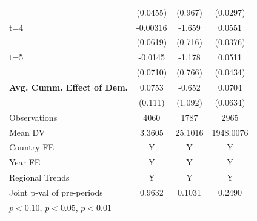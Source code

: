 \begin{tabular}{l*{3}{c}}
            &    (0.0455)         &     (0.967)         &    (0.0297)         \\
t=4         &    -0.00316         &      -1.659\sym{**} &      0.0551         \\
            &    (0.0619)         &     (0.716)         &    (0.0376)         \\
t=5         &     -0.0145         &      -1.178         &      0.0511         \\
            &    (0.0710)         &     (0.766)         &    (0.0434)         \\
\hline\textbf{Avg. Cumm. Effect of Dem.}&      0.0753         &      -0.652         &      0.0704         \\
            &     (0.111)         &     (1.092)         &    (0.0634)         \\
\midrule
Observations&        4060         &        1787         &        2965         \\
Mean DV     &      3.3605         &     25.1016         &   1948.0076         \\
Country FE  &           Y         &           Y         &           Y         \\
Year FE     &           Y         &           Y         &           Y         \\
Regional Trends&           Y         &           Y         &           Y         \\
Joint p-val of pre-periods&      0.9632         &      0.1031         &      0.2490         \\
\hline
\multicolumn{4}{l}{\footnotesize \sym{*} \(p<0.10\), \sym{**} \(p<0.05\), \sym{***} \(p<0.01\)}\\
\end{tabular}
